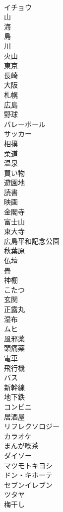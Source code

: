 \documentclass[8pt]{extreport}
\begin{document}
\begin{CJK}{UTF8}{min}
\\	イチョウ
\\	山
\\	海
\\	島
\\	川
\\	火山
\\	東京
\\	長崎
\\	大阪
\\	札幌
\\	広島
\\	野球
\\	バレーボール
\\	サッカー
\\	相撲
\\	柔道
\\	温泉
\\	買い物
\\	遊園地
\\	読書
\\	映画
\\	金閣寺
\\	富士山
\\	東大寺
\\	広島平和記念公園
\\	秋葉原
\\	仏壇
\\	畳
\\	神棚
\\	こたつ
\\	玄関
\\	正露丸
\\	湿布
\\	ムヒ
\\	風邪薬
\\	頭痛薬
\\	電車
\\	飛行機
\\	バス
\\	新幹線
\\	地下鉄
\\	コンビニ
\\	居酒屋
\\	リフレクソロジー
\\	カラオケ
\\	まんが喫茶
\\	ダイソー
\\	マツモトキヨシ
\\	ドン・キホーテ
\\	セブンイレブン
\\	ツタヤ
\\	梅干し

\end{CJK}
\end{document}
